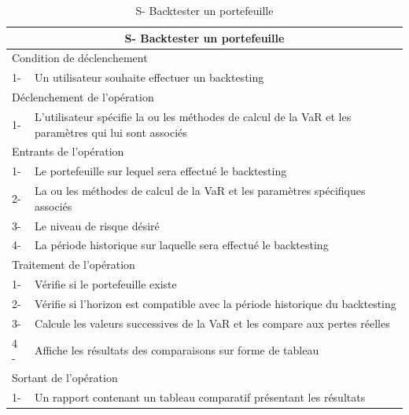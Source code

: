\documentclass[a4paper]{report}
\newcounter{cptspec}
\begin{document}
\begin{table}[H]
  \begin{tabularx}{1\textwidth}{|l|X|}
    \hline
    \multicolumn{2}{|c|}{S\thecptspec - Backtester un portefeuille} \\
    \hline
    \multicolumn{2}{|l|}{Condition de déclenchement} \\
    \hline
    1- & Un utilisateur souhaite effectuer un backtesting \\
    \hline
    \multicolumn{2}{|l|}{Déclenchement de l’opération} \\
    \hline
    1- & L'utilisateur spécifie la ou les méthodes de calcul de la VaR et les paramètres qui lui sont associés \\
    \hline
    \multicolumn{2}{|l|}{Entrants de l’opération} \\
    \hline
    1- & Le portefeuille sur lequel sera effectué le backtesting \\
    2- & La ou les méthodes de calcul de la VaR et les paramètres spécifiques associés\\
    3- & Le niveau de risque désiré \\
    4- & La période historique sur laquelle sera effectué le backtesting \\
    \hline
    \multicolumn{2}{|l|}{Traitement de l’opération} \\
    \hline
    1- & Vérifie si le portefeuille existe \\
    2- & Vérifie si l'horizon est compatible avec la période historique du backtesting \\
    3- & Calcule les valeurs successives de la VaR et les compare aux pertes réelles \\
    4 - & Affiche les résultats des comparaisons sur forme de tableau \\
    \hline
    \multicolumn{2}{|l|}{Sortant de l’opération} \\
    \hline
    1-& Un rapport contenant un tableau comparatif présentant les résultats \\
    \hline
  \end{tabularx}
  \caption{S\thecptspec - Backtester un portefeuille}
\end{table}
\end{document}
